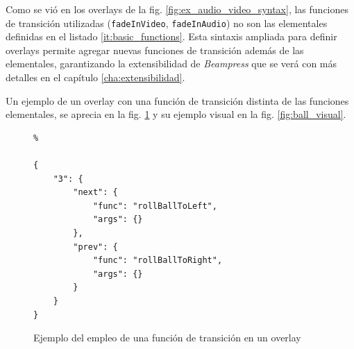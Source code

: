 		
		Como se vió en los overlays de la fig. \ref{fig:ex_audio_video_syntax}, las funciones de transición utilizadas (\texttt{fadeInVideo}, \texttt{fadeInAudio}) no son las elementales definidas en el listado \ref{it:basic_functions}. Esta sintaxis ampliada para definir overlays permite agregar nuevas funciones de transición además de las elementales, garantizando la extensibilidad de \textit{Beampress} que se verá con más detalles en el capítulo \ref{cha:extensibilidad}.


		Un ejemplo de un overlay con una función de transición distinta de las funciones elementales, se aprecia en la fig. \ref{fig:ball_code} y su ejemplo visual en la fig. \ref{fig:ball_visual}.



		\begin{figure}[htb]%
			\begin{lstlisting}%

{
    "3": {
        "next": {
            "func": "rollBallToLeft",
            "args": {}
        },
        "prev": {
            "func": "rollBallToRight",
            "args": {}
        }
    }
}
			\end{lstlisting}
		\caption{Ejemplo del empleo de una función de transición en un overlay} 
			\label{fig:ball_code} 
		\end{figure}	




